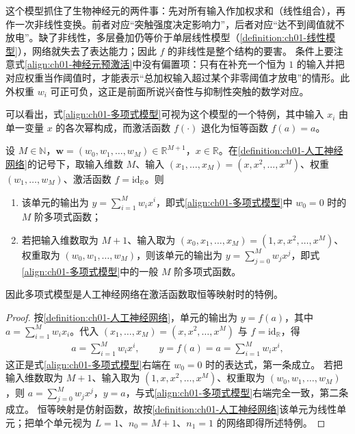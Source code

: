 \documentclass[../../main.tex]{subfiles}
\begin{document}
\begin{remark}
这个模型抓住了生物神经元的两件事：先对所有输入作加权求和（线性组合），再作一次非线性变换。前者对应“突触强度决定影响力”，后者对应“达不到阈值就不放电”。缺了非线性，多层叠加仍等价于单层线性模型（\cref{definition:ch01-线性模型}），网络就失去了表达能力；因此 $f$ 的非线性是整个结构的要害。
条件上要注意式\eqref{align:ch01-神经元预激活}中没有偏置项：只有在补充一个恒为 $1$ 的输入并把对应权重当作阈值时，才能表示“总加权输入超过某个非零阈值才放电”的情形。此外权重 $w_i$ 可正可负，这正是前面所说兴奋性与抑制性突触的数学对应。
\end{remark}

可以看出，式\eqref{align:ch01-多项式模型}可视为这个模型的一个特例，其中输入 $x_i$ 由单一变量 $x$ 的各次幂构成，而激活函数 $f(\cdot)$ 退化为恒等函数 $f(a)=a$。

\begin{proposition}[多项式函数是神经元模型的特例]\label{proposition:ch01-多项式是神经元特例}
设 $M\in\mathbb{N}$，$\mathbf{w}=(w_0,w_1,\dots,w_M)\in\mathbb{R}^{M+1}$，$x\in\mathbb{R}$。在\cref{definition:ch01-人工神经网络}的记号下，取输入维数 $M$、输入 $(x_1,\dots,x_M)=(x,x^{2},\dots,x^{M})$、权重 $(w_1,\dots,w_M)$、激活函数 $f=\mathrm{id}_{\mathbb{R}}$。则
\begin{enumerate}
  \item 该单元的输出为 $y=\sum_{i=1}^{M}w_ix^{i}$，即式\eqref{align:ch01-多项式模型}中 $w_0=0$ 时的 $M$ 阶多项式函数；
  \item 若把输入维数取为 $M+1$、输入取为 $(x_0,x_1,\dots,x_M)=(1,x,x^{2},\dots,x^{M})$、权重取为 $(w_0,w_1,\dots,w_M)$，则该单元的输出为 $y=\sum_{j=0}^{M}w_jx^{j}$，即式\eqref{align:ch01-多项式模型}中的一般 $M$ 阶多项式函数。
\end{enumerate}
因此多项式模型是人工神经网络在激活函数取恒等映射时的特例。
\end{proposition}

\begin{proof}
按\cref{definition:ch01-人工神经网络}，单元的输出为 $y=f(a)$，其中 $a=\sum_{i=1}^{M}w_ix_i$。代入 $(x_1,\dots,x_M)=(x,x^{2},\dots,x^{M})$ 与 $f=\mathrm{id}_{\mathbb{R}}$，得
\begin{align*}
 a=\sum_{i=1}^{M}w_ix^{i},
 \qquad
 y=f(a)=a=\sum_{i=1}^{M}w_ix^{i},
\end{align*}
这正是式\eqref{align:ch01-多项式模型}右端在 $w_0=0$ 时的表达式，第一条成立。
若把输入维数取为 $M+1$、输入取为 $(1,x,x^{2},\dots,x^{M})$、权重取为 $(w_0,w_1,\dots,w_M)$，则 $a=\sum_{j=0}^{M}w_jx^{j}$，$y=a$，与式\eqref{align:ch01-多项式模型}右端完全一致，第二条成立。
恒等映射是仿射函数，故按\cref{definition:ch01-人工神经网络}该单元为线性单元；把单个单元视为 $L=1$、$n_{0}=M+1$、$n_{1}=1$ 的网络即得所述特例。
\end{proof}
\end{document}
